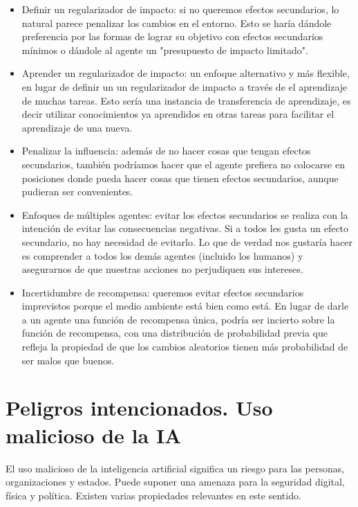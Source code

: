 \documentclass[12pt,a4paper]{article}
\begin{document}
\begin{itemize}
\item Definir un regularizador de impacto: si no queremos efectos secundarios, lo natural parece penalizar los cambios en el entorno. Esto se haría dándole preferencia por las formas de lograr su objetivo con efectos secundarios mínimos o dándole al agente un "presupuesto de impacto limitado".

\item Aprender un regularizador de impacto: un enfoque alternativo y más flexible, en lugar de definir un un regularizador de impacto a través de el aprendizaje de muchas tareas. Esto sería una instancia de transferencia de aprendizaje, es decir utilizar conocimientos ya aprendidos en otras tareas para facilitar el aprendizaje de una nueva.

\item Penalizar la influencia: además de no hacer cosas que tengan efectos secundarios, también podríamos hacer que el agente prefiera no colocarse en posiciones donde pueda hacer cosas que tienen efectos secundarios, aunque pudieran ser convenientes.

\item Enfoques de múltiples agentes: evitar los efectos secundarios se realiza con la intención de evitar las consecuencias negativas. Si a todos les gusta un efecto secundario, no hay necesidad de evitarlo. Lo que de verdad nos gustaría hacer es comprender a todos los demás agentes (incluido los humanos) y asegurarnos de que nuestras acciones no perjudiquen sus intereses.

\item Incertidumbre de recompensa: queremos evitar efectos secundarios imprevistos porque el medio ambiente está bien como está. En lugar de darle a un agente una función de recompensa única, podría ser incierto sobre la función de recompensa, con una distribución de probabilidad previa que refleja la propiedad de que los cambios aleatorios tienen más probabilidad de ser malos que buenos.
\end{itemize}

\section{Peligros intencionados. Uso malicioso de la IA}
El uso malicioso de la inteligencia artificial significa un riesgo para las personas, organizaciones y estados. Puede suponer una amenaza para la seguridad digital, física y política. Existen varias propiedades relevantes en este sentido.
\end{document}
